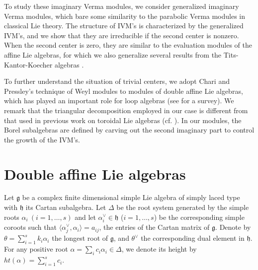 \documentclass[11pt]{amsproc}
\theoremstyle{definition}
\theoremstyle{remark}
\numberwithin{equation}{section} \errorcontextlines=0
\begin{document}
To study these imaginary Verma modules, we consider
generalized imaginary Verma modules, which bare some similarity to
the parabolic Verma modules in classical Lie theory. The
structure of IVM's is characterized by the generalized
IVM's, and we show that they are irreducible if the second center is
nonzero. When the second center is zero, they are similar to
the evaluation modules of the affine Lie algebras, for which we also generalize several
results from the Tits-Kantor-Koecher algebras \cite{CT}.

To further understand the situation of trivial centers, we adopt
Chari and Pressley's technique \cite{CP, VT} of Weyl modules to
modules of double affine Lie algebras, which has played an important
role for loop algebras (see \cite{C} for a survey). We remark that
the triangular decomposition employed in our case is different from
that used in previous work on toroidal Lie algebras
(cf. \cite{FK, SE2,SE1}). In our modules, the Borel subalgebras are
defined by carving out the second imaginary part to control the
growth of the IVM's.

\section{Double affine Lie algebras}

Let $\mathfrak{g}$ be a complex finite dimensional simple Lie
algebra of simply laced type with $\mathfrak{h}$ its Cartan
subalgebra. Let $\Delta$ be the root system generated by the simple
roots $\alpha_i~(i=1, \ldots, s)$ and let $\alpha_i^{\vee}\in
\mathfrak h$ ($i=1, \ldots, s$) be the corresponding simple coroots
such that $\langle \alpha_j^{\vee}, \alpha_i\rangle=a_{ij}$, the
entries of the Cartan matrix of $\mathfrak g$. Denote by
$\theta=\sum\limits_{i=1}^s k_i\alpha_i$ the longest root of
$\mathfrak{g}$, and $\theta^{\vee}$ the corresponding dual element
in $\mathfrak{h}$. For any positive root
$\alpha=\sum_ic_i\alpha_i\in\Delta$, we denote its height by
$ht(\alpha)=\sum_{i=1}^sc_i$.
\end{document}
